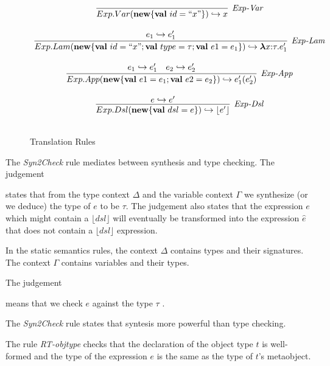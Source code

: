 \begin{figure}
\centering
\[
\begin{array}{c}

\infer[\textit{Exp-Var}]
	{Exp.Var(\keyw{new} \{\keyw{val}\ id=``x"\}) \hookrightarrow x  }
	{ } \\[3ex]

\infer[\textit{Exp-Lam}]
	{Exp.Lam(\keyw{new} \{\keyw{val}\ id=``x"; \keyw{val}\ type=\tau; \keyw{val}\ e1=e_1 \}) \hookrightarrow  \boldsymbol\lambda x{:}\tau . e'_1 }
	{e_1 \hookrightarrow e'_1 } \\[3ex]

\infer[\textit{Exp-App}]
	{Exp.App(\keyw{new} \{\keyw{val}\ e1=e_1;\keyw{val}\ e2=e_2\}) \hookrightarrow e'_1(e'_2)  }
	{e_1 \hookrightarrow e'_1 & e_2 \hookrightarrow e'_2  } \\[3ex]

\infer[\textit{Exp-Dsl}]
	{Exp.Dsl(\keyw{new} \{\keyw{val}\ dsl= e \}) \hookrightarrow \lfloor e' \rfloor  }
	{e \hookrightarrow e' } \\[3ex]
   
\end{array}
\]
\caption{Translation Rules}
\end{figure}

The \textit{Syn2Check} rule mediates between synthesis and type checking. 
The judgement 


states that from the type context $\Delta$ and the variable context $\Gamma$ we synthesize (or we deduce) the type of $e$ to be $\tau$. The judgement also states that the expression $e$ which might contain a $\lfloor dsl \rfloor$ will eventually be transformed into the expression $\hat{e}$ that does not contain a $\lfloor dsl \rfloor$ expression.

In the static semantics rules, the context $\Delta$ contains types and their signatures. The context $\Gamma$ contains variables and their types. 

The judgement 


means that we check $e$ against the type $\tau$ . 

The \textit{Syn2Check} rule states that syntesis more powerful than type checking.

The rule \textit{RT-objtype} checks that the declaration of the object type $t$ is well-formed and the type of the expression $e$ is the same as the type of $t$'s metaobject.

